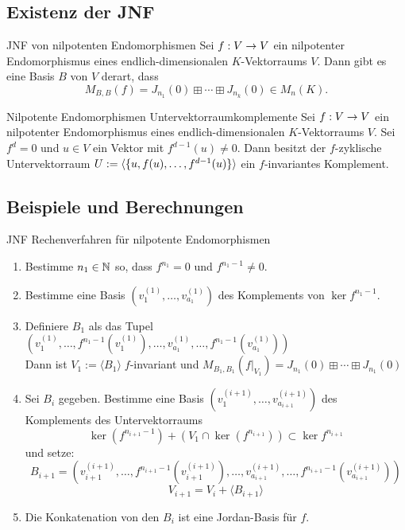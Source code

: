 \documentclass[main.tex]{subfiles}
\begin{document}
\subsection*{Existenz der JNF}

\begin{karte}{JNF von nilpotenten Endomorphismen}
    Sei \(f : V \rightarrow V\) ein nilpotenter Endomorphismus eines endlich-dimensionalen
    \(K\)-Vektorraums \(V\). Dann gibt es eine Basis \(B\) von \(V\) derart, dass
    \[ M_{B,B}(f) = J_{n_1}(0) \boxplus \cdots \boxplus J_{n_k}(0) \in M_n(K). \]
\end{karte}

\begin{karte}{Nilpotente Endomorphismen Untervektorraumkomplemente}
    Sei \(f : V \rightarrow V\) ein nilpotenter Endomorphismus eines endlich-dimensionalen
    \(K\)-Vektorraums \(V\). Sei \(f^d = 0\) und \(u \in V\) ein Vektor mit
    \(f^{d-1}(u) \neq 0\). Dann besitzt der \(f\)-zyklische Untervektorraum
    \(U := \langle \{u, f(u), \ldots, f^{d-1}(u)\}\rangle\) ein \(f\)-invariantes
    Komplement.
\end{karte}

\subsection*{Beispiele und Berechnungen}

\begin{karte}{JNF Rechenverfahren für nilpotente Endomorphismen}
    \begin{enumerate}
        \item Bestimme \(n_1 \in \mathbb{N}\) so, dass \(f^{n_1} = 0 \) und
        \(f^{n_1-1} \neq 0\).
        \item Bestimme eine Basis \((v^{(1)}_1,\ldots,v^{(1)}_{a_1})\)
        des Komplements von \(\ker f^{n_1-1}\).
        \item Definiere \(B_1\) als das Tupel\\
        \( \left(v_1^{(1)}, \ldots, f^{n_1-1}\left(v_1^{(1)}\right), \ldots,
        v_{a_1}^{(1)}, \ldots, f^{n_1-1}\left(v_{a_1}^{(1)}\right)\right) \)\\
        Dann ist \(V_1:=\langle B_1 \rangle \; f\)-invariant und
        \( M_{B_1,B_1}(f\vert_{V_1}) = J_{n_1}(0) \boxplus \cdots \boxplus J_{n_1}(0) \)
        \item Sei \(B_i\) gegeben. Bestimme eine Basis \((v_1^{(i+1)},\ldots, v_{a_{i+1}}^{(i+1)})\)
        des Komplements des Untervektorraums
        \[ \ker(f^{n_{i+1}-1}) + (V_1 \cap \ker(f^{n_{i+1}})) \subset \ker f^{n_{i+1}} \]
        und setze:
        \[ B_{i+1} = \left(v_{i+1}^{(i+1)}, \ldots, f^{n_{i+1}-1}\left(v_{i+1}^{(i+1)}\right), \ldots,
        v_{a_{i+1}}^{(i+1)}, \ldots, f^{n_{i+1}-1}\left(v_{a_{i+1}}^{(i+1)}\right)\right) \]
        \[ V_{i+1} = V_i + \langle B_{i+1} \rangle \]
        \item Die Konkatenation von den \(B_i\) ist eine Jordan-Basis für \(f\).
    \end{enumerate}    
\end{karte}
\end{document}
